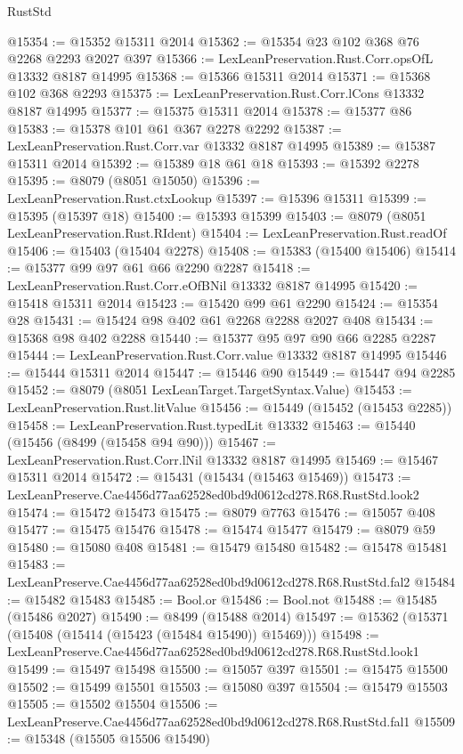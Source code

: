\begin{lexlean}{RustStd}
\begin{coremodule}
@15354 := @15352 @15311 @2014
@15362 := @15354 @23 @102 @368 @76 @2268 @2293 @2027 @397
@15366 := LexLeanPreservation.Rust.Corr.opsOfL @13332 @8187 @14995
@15368 := @15366 @15311 @2014
@15371 := @15368 @102 @368 @2293
@15375 := LexLeanPreservation.Rust.Corr.lCons @13332 @8187 @14995
@15377 := @15375 @15311 @2014
@15378 := @15377 @86
@15383 := @15378 @101 @61 @367 @2278 @2292
@15387 := LexLeanPreservation.Rust.Corr.var @13332 @8187 @14995
@15389 := @15387 @15311 @2014
@15392 := @15389 @18 @61 @18
@15393 := @15392 @2278
@15395 := @8079 (@8051 @15050)
@15396 := LexLeanPreservation.Rust.ctxLookup
@15397 := @15396 @15311
@15399 := @15395 (@15397 @18)
@15400 := @15393 @15399
@15403 := @8079 (@8051 LexLeanPreservation.Rust.RIdent)
@15404 := LexLeanPreservation.Rust.readOf
@15406 := @15403 (@15404 @2278)
@15408 := @15383 (@15400 @15406)
@15414 := @15377 @99 @97 @61 @66 @2290 @2287
@15418 := LexLeanPreservation.Rust.Corr.eOfBNil @13332 @8187 @14995
@15420 := @15418 @15311 @2014
@15423 := @15420 @99 @61 @2290
@15424 := @15354 @28
@15431 := @15424 @98 @402 @61 @2268 @2288 @2027 @408
@15434 := @15368 @98 @402 @2288
@15440 := @15377 @95 @97 @90 @66 @2285 @2287
@15444 := LexLeanPreservation.Rust.Corr.value @13332 @8187 @14995
@15446 := @15444 @15311 @2014
@15447 := @15446 @90
@15449 := @15447 @94 @2285
@15452 := @8079 (@8051 LexLeanTarget.TargetSyntax.Value)
@15453 := LexLeanPreservation.Rust.litValue
@15456 := @15449 (@15452 (@15453 @2285))
@15458 := LexLeanPreservation.Rust.typedLit @13332
@15463 := @15440 (@15456 (@8499 (@15458 @94 @90)))
@15467 := LexLeanPreservation.Rust.Corr.lNil @13332 @8187 @14995
@15469 := @15467 @15311 @2014
@15472 := @15431 (@15434 (@15463 @15469))
@15473 := LexLeanPreserve.Cae4456d77aa62528ed0bd9d0612cd278.R68.RustStd.look2
@15474 := @15472 @15473
@15475 := @8079 @7763
@15476 := @15057 @408
@15477 := @15475 @15476
@15478 := @15474 @15477
@15479 := @8079 @59
@15480 := @15080 @408
@15481 := @15479 @15480
@15482 := @15478 @15481
@15483 := LexLeanPreserve.Cae4456d77aa62528ed0bd9d0612cd278.R68.RustStd.fal2
@15484 := @15482 @15483
@15485 := Bool.or
@15486 := Bool.not
@15488 := @15485 (@15486 @2027)
@15490 := @8499 (@15488 @2014)
@15497 := @15362 (@15371 (@15408 (@15414 (@15423 (@15484 @15490)) @15469)))
@15498 := LexLeanPreserve.Cae4456d77aa62528ed0bd9d0612cd278.R68.RustStd.look1
@15499 := @15497 @15498
@15500 := @15057 @397
@15501 := @15475 @15500
@15502 := @15499 @15501
@15503 := @15080 @397
@15504 := @15479 @15503
@15505 := @15502 @15504
@15506 := LexLeanPreserve.Cae4456d77aa62528ed0bd9d0612cd278.R68.RustStd.fal1
@15509 := @15348 (@15505 @15506 @15490)

\end{coremodule}
\end{lexlean}
